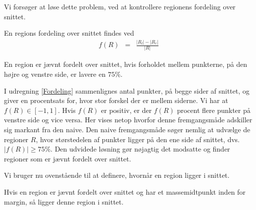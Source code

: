 {Vi forsøger at løse dette problem, ved at kontrollere regionens
fordeling over snittet.

\begin{definition}
    En regions fordeling over snittet findes ved
    \begin{eqnarray}
        f(R) & = & \frac{|R_{l}| - |R_{r}|}{|R|}
        \label{Fordeling}
    \end{eqnarray}
    \label{def_fordeling_ligning}
\end{definition}

\begin{definition}
    En region er jævnt fordelt over snittet, hvis forholdet mellem
    punkterne, på den højre og venstre side, er lavere en $75\%$.
    \label{def_fordeling_procent}
\end{definition}

I udregning \eqref{Fordeling} sammenlignes antal punkter, på begge sider af
snittet, og giver en procentsats for, hvor stor forskel der er mellem
siderne. Vi har at $f(R) \in [-1,1]$.  Hvis $f(R)$ er positiv, er der
$f(R)$ procent flere punkter på venstre side og vice versa. Her vises
netop hvorfor denne fremgangsmåde adskiller sig markant fra den naive.
Den naive fremgangsmåde søger nemlig at udvælge de regioner $R$, hvor
størstedelen af punkter ligger på den ene side af snittet, dvs. $|f(R)|
\geq 75\%$. Den udvidede løsning gør nøjagtig det modsatte og finder
regioner som er jævnt fordelt over snittet.

Vi bruger nu ovenstående til at definere, hvornår en region ligger i
snittet.

\begin{definition}
    Hvis en region er jævnt fordelt over snittet og har et
    massemidtpunkt inden for margin, så ligger denne region i snittet.
    \label{def_expanded}
\end{definition}

%

}

